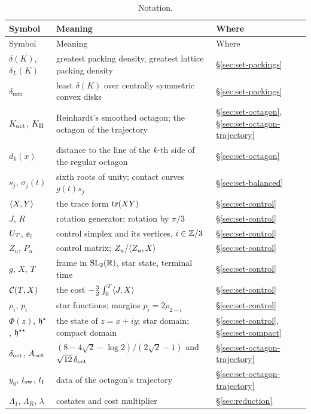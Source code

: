 \begin{longtable}{@{}p{}p{}p{}@{}}
\caption{Notation.}\label{tab:notation}\\
\toprule
Symbol & Meaning & Where\\
\midrule
\endfirsthead
\toprule
Symbol & Meaning & Where\\
\midrule
\endhead
\bottomrule
\endfoot
$\delta(K)$, $\delta_L(K)$ & greatest packing density, greatest lattice packing density & \S\ref{sec:set-packings}\\
$\delta_{\min}$ & least $\delta(K)$ over centrally symmetric convex disks & \S\ref{sec:set-packings}\\
$K_{\mathrm{oct}}$, $K_{\mathrm{H}}$ & Reinhardt's smoothed octagon; the octagon of the trajectory & \S\ref{sec:set-octagon}, \S\ref{sec:set-octagon-trajectory}\\
$d_k(x)$ & distance to the line of the $k$-th side of the regular octagon & \S\ref{sec:set-octagon}\\
$s_j$, $\sigma_j(t)$ & sixth roots of unity; contact curves $g(t)s_j$ & \S\ref{sec:set-balanced}\\
$\langle X,Y\rangle$ & the trace form $\operatorname{tr}(XY)$ & \S\ref{sec:set-control}\\
$J$, $R$ & rotation generator; rotation by $\pi/3$ & \S\ref{sec:set-control}\\
$U_{T}$, $\ee_i$ & control simplex and its vertices, $i\in\mathbb{Z}/3$ & \S\ref{sec:set-control}\\
$Z_u$, $P_u$ & control matrix; $Z_u/\langle Z_u,X\rangle$ & \S\ref{sec:set-control}\\
$g$, $X$, $T$ & frame in $\mathrm{SL}_2(\mathbb{R})$, star state, terminal time & \S\ref{sec:set-control}\\
$\mathcal{C}(T,X)$ & the cost $-\tfrac32\int_0^T\langle J,X\rangle$ & \S\ref{sec:set-control}\\
$\rho_i$, $p_i$ & star functions; margins $p_i=2\rho_{2-i}$ & \S\ref{sec:set-control}\\
$\Phi(z)$, $\mathfrak{h}^{\star}$, $\mathfrak{h}^{\star\star}$ & the state of $z=x+iy$; star domain; compact domain & \S\ref{sec:set-control}, \S\ref{sec:set-compact}\\
$\delta_{\mathrm{oct}}$, $A_{\mathrm{oct}}$ & $(8-4\sqrt2-\log2)/(2\sqrt2-1)$ and $\sqrt{12}\,\delta_{\mathrm{oct}}$ & \S\ref{sec:set-octagon-trajectory}\\
$y_0$, $t_{\mathrm{sw}}$, $t_{\mathrm{f}}$ & data of the octagon's trajectory & \S\ref{sec:set-octagon-trajectory}\\
$\Lambda_1$, $\Lambda_R$, $\lambda$ & costates and cost multiplier & \S\ref{sec:reduction}\\

\end{longtable}
